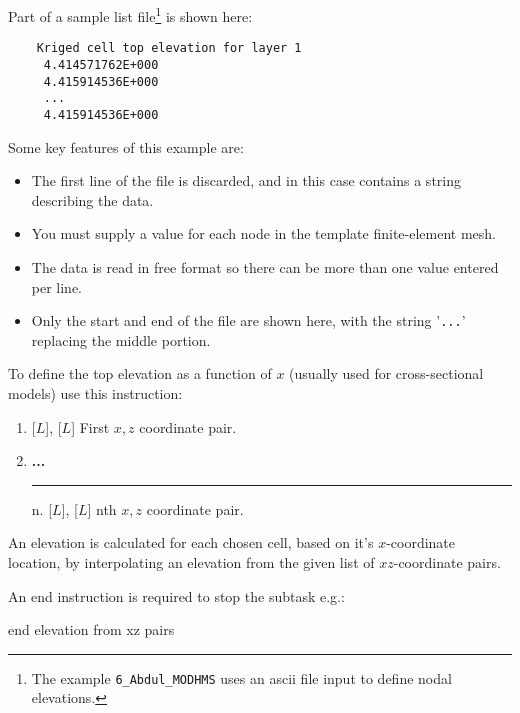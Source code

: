 Part of a sample list file\footnote{The example \texttt{6\_Abdul\_MODHMS} uses an ascii file input to define nodal elevations.} is shown here:
    \begin{verbatim}
    Kriged cell top elevation for layer 1
     4.414571762E+000
     4.415914536E+000
     ...
     4.415914536E+000
     \end{verbatim}
     \squish
Some key features of this example are:
\begin{itemize}
  \item The first line of the file is discarded, and in this case contains a string describing the data.
  \item You must supply a value for each node in the template finite-element mesh.
  \item The data is read in free format so there can be more than one value entered per line.
  \item Only the start and end of the file are shown here, with the string '\texttt{...}' replacing the middle portion.
\end{itemize}

To define the top elevation as a function of $x$ (usually used for cross-sectional models) use this instruction:

    {
    \squish
    \begin{enumerate}
    \item {} [$L$],  [$L$]  First $x, z$ coordinate pair.
    \item \textbf{...} \\
     \hspace*{-.27in}\rule{0.in}{.24in}  n.  [$L$],  [$L$]  nth $x, z$ coordinate pair.
    \end{enumerate}

     An elevation is calculated for each chosen cell, based on it's $x$-coordinate location, by interpolating an elevation from the given list of  $xz$-coordinate pairs.

    An end instruction is required to stop the subtask e.g.:

    {\Large \sf end elevation from xz pairs}
    }

